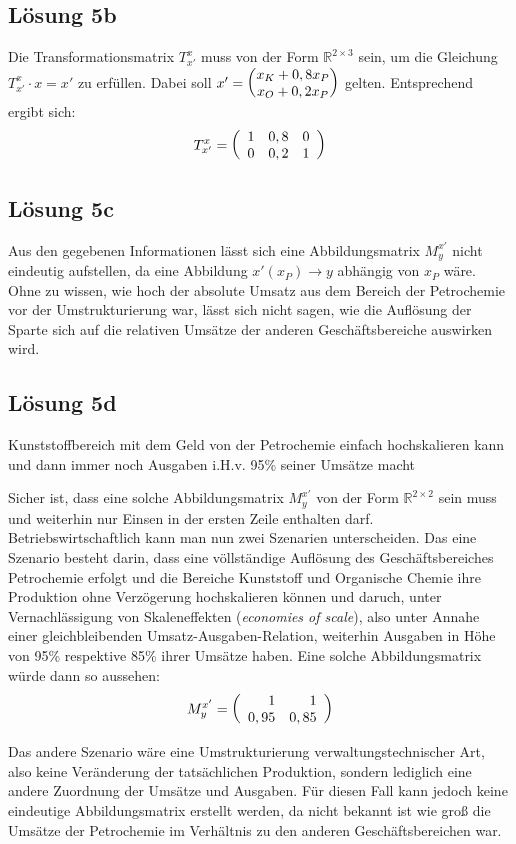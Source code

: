 \documentclass[main.tex]{subfiles}7
\begin{document}
\subsection{Lösung 5b}
Die Transformationsmatrix $T^x_{x'}$ muss von der Form $\mathbb{R}^{2\times 3}$ sein, um die Gleichung $T^x_{x'} \cdot x = x'$ zu erfüllen.
Dabei soll $x' = \vektor{x_K + 0,8x_P \\ x_O +0,2x_P}$ gelten. Entsprechend ergibt sich:
$$
    T^x_{x'} = \eqmatrix{rrr}{1 & 0,8 & 0 \\ 0 & 0,2 & 1}
$$

\subsection{Lösung 5c}
Aus den gegebenen Informationen lässt sich eine Abbildungsmatrix $M^{x'}_y$ nicht eindeutig aufstellen, da eine Abbildung $x'(x_P) \to y$ abhängig von $x_P$ wäre.\\

Ohne zu wissen, wie hoch der absolute Umsatz aus dem Bereich der Petrochemie vor der Umstrukturierung war, lässt sich nicht sagen, wie die Auflösung der Sparte sich auf die relativen Umsätze der anderen Geschäftsbereiche auswirken wird.

\subsection{Lösung 5d}

Kunststoffbereich mit dem Geld von der Petrochemie einfach hochskalieren kann und dann immer noch Ausgaben i.H.v. 95\% seiner Umsätze macht

Sicher ist, dass eine solche Abbildungsmatrix $M^{x'}_y$ von der Form $\mathbb{R}^{2\times 2}$ sein muss und weiterhin nur Einsen in der ersten Zeile enthalten darf.\\

Betriebswirtschaftlich kann man nun zwei Szenarien unterscheiden. Das eine Szenario besteht darin, dass eine völlständige Auflösung des Geschäftsbereiches Petrochemie erfolgt und die Bereiche Kunststoff und Organische Chemie ihre Produktion ohne Verzögerung hochskalieren können und daruch, unter Vernachlässigung von Skaleneffekten (\textit{economies of scale}), also unter Annahe einer gleichbleibenden Umsatz-Ausgaben-Relation, weiterhin Ausgaben in Höhe von 95\% respektive 85\% ihrer Umsätze haben. Eine solche Abbildungsmatrix würde dann so aussehen:
$$
    M^{x'}_y = \eqmatrix{rr}{1 & 1 \\ 0,95 & 0,85}
$$

Das andere Szenario wäre eine Umstrukturierung verwaltungstechnischer Art, also keine Veränderung der tatsächlichen Produktion, sondern lediglich eine andere Zuordnung der Umsätze und Ausgaben. Für diesen Fall kann jedoch keine eindeutige Abbildungsmatrix erstellt werden, da nicht bekannt ist wie groß die Umsätze der Petrochemie im Verhältnis zu den anderen Geschäftsbereichen war.
\end{document}
